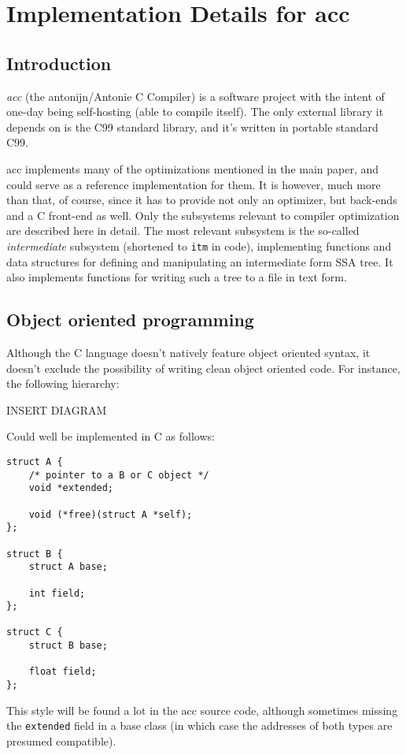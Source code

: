 \documentclass[12pt, a4paper]{article}
\begin{document}
\newpage
\appendix
\section{Implementation Details for acc}
\subsection{Introduction}
  \textit{acc} (the antonijn/Antonie C Compiler) is a software project with the intent of
one-day being self-hosting (able to compile itself). The only external library
it depends on is the C99 standard library, and it's written in portable standard C99.

  acc implements many of the optimizations mentioned in the main paper, and could
serve as a reference implementation for them. It is however, much more than that,
of course, since it has to provide not only an optimizer, but back-ends and a C
front-end as well. Only the subsystems relevant to compiler optimization are
described here in detail. The most relevant subsystem is the so-called
\textit{intermediate} subsystem (shortened to \verb+itm+ in code), implementing
functions and data structures for defining and manipulating an intermediate form
SSA tree. It also implements functions for writing such a tree to a file in text
form.

  \subsection{Object oriented programming}
Although the C language doesn't natively feature object oriented syntax, it doesn't
exclude the possibility of writing clean object oriented code. For instance, the
following hierarchy:

INSERT DIAGRAM

Could well be implemented in C as follows:

\begin{lstlisting}
struct A {
	/* pointer to a B or C object */
	void *extended;

	void (*free)(struct A *self);
};

struct B {
	struct A base;

	int field;
};

struct C {
	struct B base;

	float field;
};
\end{lstlisting}

This style will be found a lot in the acc source code, although sometimes
missing the \verb+extended+ field in a base class (in which case the addresses
of both types are presumed compatible).
\end{document}
